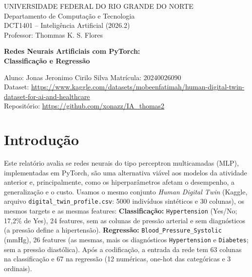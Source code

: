 \documentclass[11pt,a4paper]{article}
\begin{document}
\begin{titlepage}\centering
{\large UNIVERSIDADE FEDERAL DO RIO GRANDE DO NORTE\\Departamento de Computação e Tecnologia\\DCT1401 -- Inteligência Artificial (2026.2)\\Professor: Thommas K. S. Flores\\}\vspace{2cm}
{\LARGE\bfseries Redes Neurais Artificiais com PyTorch:\\Classificação e Regressão\par}
\vspace{2cm}Aluno: Jonas Jeronimo Cirilo Silva \quad Matrícula: 20240026090\\[1ex]
Dataset: \url{https://www.kaggle.com/datasets/mobeenfatimah/human-digital-twin-dataset-for-ai-and-healthcare}\\[1ex]
Repositório: \url{https://github.com/xonazz/IA_thomas2}
\end{titlepage}
\tableofcontents\newpage

\section{Introdução}
Este relatório avalia se redes neurais do tipo perceptron multicamadas (MLP), implementadas em PyTorch, são uma alternativa viável
aos modelos da atividade anterior e, principalmente, como os hiperparâmetros afetam o desempenho, a generalização e o custo.
Usamos o mesmo conjunto \emph{Human Digital Twin} (Kaggle, arquivo \texttt{digital\_twin\_profile.csv}: 5000 indivíduos sintéticos e
30 colunas), os mesmos targets e as mesmas features:
\textbf{Classificação:} \texttt{Hypertension} (Yes/No; 17,2\% de Yes), 24 features, sem as colunas de pressão arterial e sem diagnósticos
(a pressão define a hipertensão). \textbf{Regressão:} \texttt{Blood\_Pressure\_Systolic} (mmHg), 26 features (as mesmas, mais os
diagnósticos \texttt{Hypertension} e \texttt{Diabetes}; sem a pressão diastólica). Após a codificação, a entrada da rede tem
63 colunas na
classificação e 67 na regressão (12 numéricas, one-hot das categóricas e 3 ordinais).
\end{document}
